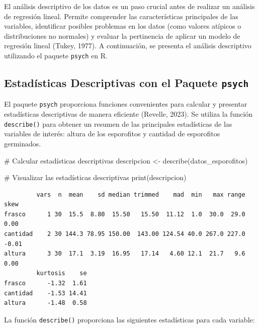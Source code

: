 \documentclass[
  spanish,
  a4paper,
  DIV=11,
  numbers=noendperiod,
  onepage,
  openany]{scrreprt}
\newenvironment{Shaded}{\begin{snugshade}}{\end{snugshade}}
\newcommand{\CommentTok}[1]{\textcolor[rgb]{0.37,0.37,0.37}{#1}}
\newcommand{\FunctionTok}[1]{\textcolor[rgb]{0.28,0.35,0.67}{#1}}
\newcommand{\NormalTok}[1]{\textcolor[rgb]{0.00,0.23,0.31}{#1}}
\newcommand{\OtherTok}[1]{\textcolor[rgb]{0.00,0.23,0.31}{#1}}
\begin{document}
El análisis descriptivo de los datos es un paso crucial antes de
realizar un análisis de regresión lineal. Permite comprender las
características principales de las variables, identificar posibles
problemas en los datos (como valores atípicos o distribuciones no
normales) y evaluar la pertinencia de aplicar un modelo de regresión
lineal (Tukey, 1977). A continuación, se presenta el análisis
descriptivo utilizando el paquete \texttt{psych} en R.

\subsection{\texorpdfstring{Estadísticas Descriptivas con el Paquete
\texttt{psych}}{Estadísticas Descriptivas con el Paquete psych}}\label{estaduxedsticas-descriptivas-con-el-paquete-psych}

El paquete \texttt{psych} proporciona funciones convenientes para
calcular y presentar estadísticas descriptivas de manera eficiente
(Revelle, 2023). Se utiliza la función \texttt{describe()} para obtener
un resumen de las principales estadísticas de las variables de interés:
altura de los esporofitos y cantidad de esporofitos germinados.

\begin{Shaded}
\begin{Highlighting}[]
\CommentTok{\# Calcular estadísticas descriptivas}
\NormalTok{descripcion }\OtherTok{\textless{}{-}} \FunctionTok{describe}\NormalTok{(datos\_esporofitos)}

\CommentTok{\# Visualizar las estadísticas descriptivas}
\FunctionTok{print}\NormalTok{(descripcion)}
\end{Highlighting}
\end{Shaded}

\begin{verbatim}
         vars  n  mean    sd median trimmed    mad  min   max range  skew
frasco      1 30  15.5  8.80  15.50   15.50  11.12  1.0  30.0  29.0  0.00
cantidad    2 30 144.3 78.95 150.00  143.00 124.54 40.0 267.0 227.0 -0.01
altura      3 30  17.1  3.19  16.95   17.14   4.60 12.1  21.7   9.6  0.00
         kurtosis    se
frasco      -1.32  1.61
cantidad    -1.53 14.41
altura      -1.48  0.58
\end{verbatim}

La función \texttt{describe()} proporciona las siguientes estadísticas
para cada variable:
\end{document}
